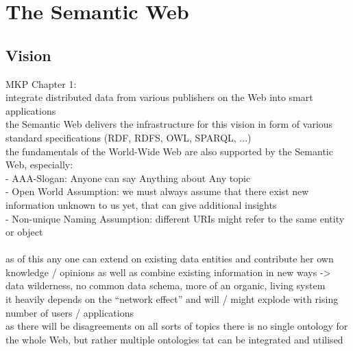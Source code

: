 
\section{The Semantic Web}
\label{sec:semantic_web}

\subsection{Vision}
\label{sec:semantic_vision}

MKP Chapter 1: \\
integrate distributed data from various publishers on the Web into smart applications \\
the Semantic Web delivers the infrastructure for this vision in form of various standard
specifications (RDF, RDFS, OWL, SPARQL, ...) \\
the fundamentals of the World-Wide Web are also supported by the Semantic Web, especially: \\
- AAA-Slogan: Anyone can say Anything about Any topic \\
- Open World Assumption: we must always assume that there exist new information unknown to us yet,
that can give additional insights \\
- Non-unique Naming Assumption: different URIs might refer to the same entity or object \\
\\
as of this any one can extend on existing data entities and contribute her own knowledge / opinions as
well as combine existing information in new ways -> data wilderness, no common data schema, more of an
organic, living system \\
it heavily depends on the ``network effect'' and will / might explode with rising number of users / applications \\
as there will be disagreements on all sorts of topics there is no single ontology for the whole Web,
but rather multiple ontologies tat can be integrated and utilised \\
\\

